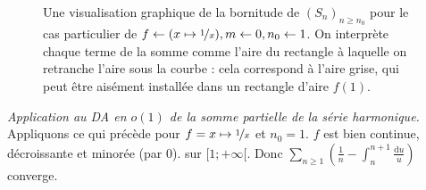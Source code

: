 \documentclass{article}
\renewenvironment{question_kholle}[2][ ]
{
	\subsection{\texorpdfstring{#2}{}}
	\notblank{#1}
	{
		\noindent #1
		\bigbreak
	}
	{}
	\begin{proof}
}
{
	\end{proof}
}
\begin{document}
\begin{question_kholle}
\begin{figure}[H]
      \caption{Une visualisation graphique de la bornitude de $(S_n)_{n \geqslant n_0}$ pour le cas particulier de $f \leftarrow (x \mapsto \nicefrac 1 x), m \leftarrow 0, n_0 \leftarrow 1$. On interprète chaque terme de la somme comme l'aire du rectangle à laquelle on retranche l'aire sous la courbe : cela correspond à l'aire grise, qui peut être aisément installée dans un rectangle d'aire $f(1)$.}
  \end{figure}

  \textit{Application au DA en $o(1)$ de la somme partielle de la série harmonique.}
  Appliquons ce qui précède pour $f = x \mapsto \nicefrac{1}{x}$ et $n_0 = 1$. $f$ est bien continue, décroissante et minorée (par 0). sur $[1; + \infty[$.
  Donc $\displaystyle \sum_{ n \geqslant 1} \left( \frac{1}{n} - \int_{n}^{n+1} \frac{\mathrm du}{u} \right)$ converge.


\end{question_kholle}
\end{document}
